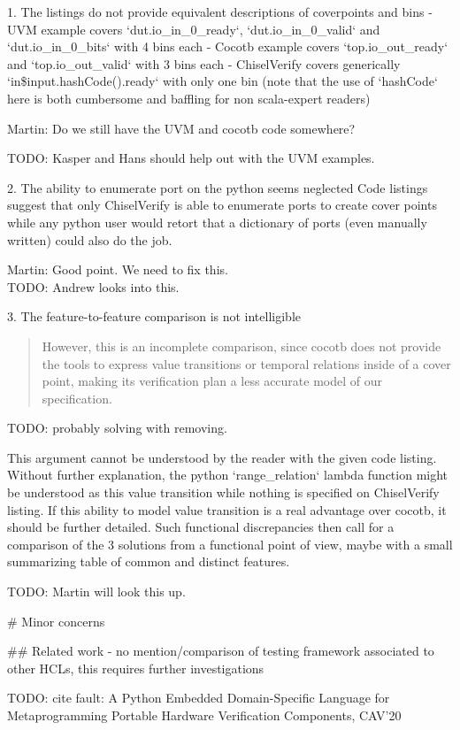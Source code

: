 \documentclass{article}
\newcommand{\todo}[1]{{\color{olive} TODO: #1}}
\newcommand{\martin}[1]{{\color{blue} Martin: #1\\}}
\begin{document}
1. The listings do not provide equivalent descriptions of coverpoints and bins
- UVM example covers `dut.io\_in\_0\_ready`, `dut.io\_in\_0\_valid` and `dut.io\_in\_0\_bits` with 4 bins each
- Cocotb example covers `top.io\_out\_ready` and `top.io\_out\_valid` with 3 bins each
- ChiselVerify covers generically `in\${input.hashCode()}.ready` with only one bin (note that the use of `hashCode` here is both cumbersome and baffling for non scala-expert readers)

\martin{Do we still have the UVM and cocotb code somewhere?}

\todo{Kasper and Hans should help out with the UVM examples.}

2. The ability to enumerate port on the python seems neglected
Code listings suggest that only ChiselVerify is able to enumerate ports to create cover points while any python user would retort that a dictionary of ports (even manually written) could also do the job.

\martin{Good point. We need to fix this.}
\todo{Andrew looks into this.}

3. The feature-to-feature comparison is not intelligible 
\begin{quote}
However, this is
an incomplete comparison, since cocotb does not provide the
tools to express value transitions or temporal relations inside
of a cover point, making its verification plan a less accurate
model of our specification. 
\end{quote}


\todo{probably solving with removing.}

This argument cannot be understood by the reader with the given code listing.
Without further explanation, the python `range\_relation` lambda function might be understood as this value transition while nothing is specified on ChiselVerify listing.
If this ability to model value transition is a real advantage over cocotb, it should be further detailed.
Such functional discrepancies then call for a comparison of the 3 solutions from a functional point of view, maybe with a small summarizing table of common and distinct features.

\todo{Martin will look this up.}

\# Minor concerns

\#\# Related work
- no mention/comparison of testing framework associated to other HCLs, this requires further investigations

\todo{cite fault: A Python Embedded Domain-Specific Language for Metaprogramming Portable Hardware Verification Components, CAV'20}
\end{document}
